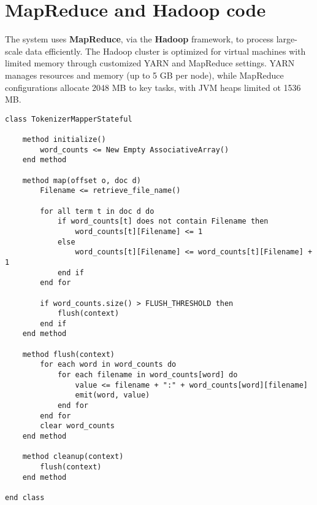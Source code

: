 \section{MapReduce and Hadoop code}
The system uses \textbf{MapReduce}, via the \textbf{Hadoop} framework, to process large-scale data efficiently. The Hadoop cluster is optimized for virtual machines with limited memory through customized YARN and MapReduce settings. YARN manages resources and memory (up to 5 GB per node), while MapReduce configurations allocate 2048 MB to key tasks, with JVM heaps limited ot 1536 MB.

\newpage 

\begin{center}
	\begin{minipage}{0.9\linewidth}
		\begin{lstlisting}[language=PseudoCode]
class TokenizerMapperStateful

	method initialize()
		word_counts <= New Empty AssociativeArray()
	end method
	
	method map(offset o, doc d)
		Filename <= retrieve_file_name()
		
		for all term t in doc d do
			if word_counts[t] does not contain Filename then
				word_counts[t][Filename] <= 1
			else
				word_counts[t][Filename] <= word_counts[t][Filename] + 1
			end if
		end for
		
		if word_counts.size() > FLUSH_THRESHOLD then
			flush(context)
		end if
	end method
	
	method flush(context)
		for each word in word_counts do
			for each filename in word_counts[word] do
				value <= filename + ":" + word_counts[word][filename]
				emit(word, value)
			end for
		end for
		clear word_counts
	end method
	
	method cleanup(context)
		flush(context)
	end method

end class
		\end{lstlisting}
		\label{fig:pseudocode-stateful-mapper}
	\end{minipage}
\end{center}
